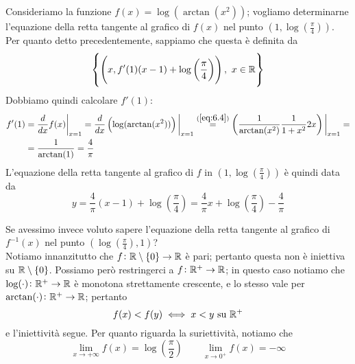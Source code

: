 \begin{example}
    Consideriamo la funzione $f(x) = \log(\arctan(x^2))$; vogliamo determinarne l'equazione della retta tangente al grafico di $f(x)$ nel punto $\left(1, \log\left(\frac{\pi}{4}\right)\right)$. Per quanto detto precedentemente, sappiamo che questa è definita da
    \[
    \left\{\left(x, f'(1)(x-1)+\log\left(\frac{\pi}{4}\right)\right), \ x\in\amsbb{R}\right\}
    \]
    Dobbiamo quindi calcolare $f'(1)$:
    \[
    \begin{split}
        f'(1) & = \frac{d}{dx}f(x)\bigg|_{x=1} = \frac{d}{dx}\left(\log(\arctan(x^2))\right)\bigg|_{x=1}\overset{(\ref{eq:6.4})}{=}\left(\frac{1}{\arctan(x^2)}\frac{1}{1+x^2}2x\right)\bigg|_{x=1} =\\
        & = \frac{1}{\arctan(1)} = \frac{4}{\pi}
    \end{split}
    \]
    L'equazione della retta tangente al grafico di $f$ in $\left(1, \log\left(\frac{\pi}{4}\right)\right)$ è quindi data da
    \[
    y = \frac{4}{\pi}(x-1)+\log\left(\frac{\pi}{4}\right) = \frac{4}{\pi}x+\log\left(\frac{\pi}{4}\right) - \frac{4}{\pi} 
    \]
    \begin{center}
    \end{center}
    Se avessimo invece voluto sapere l'equazione della retta tangente al grafico di $f^{-1}(x)$ nel punto $\left(\log\left(\frac{\pi}{4}\right), 1\right)$?\\
    Notiamo innanzitutto che $f\colon\amsbb{R}\setminus\{0\} \to \amsbb{R}$ è pari; pertanto questa non è iniettiva su $\amsbb{R}\setminus\{0\}$. Possiamo però restringerci a $f\colon \amsbb{R}^+\to \amsbb{R}$; in questo caso notiamo che $\log(\cdot)\colon \amsbb{R}^+\to \amsbb{R}$ è monotona strettamente crescente, e lo stesso vale per $\arctan(\cdot)\colon \amsbb{R}^+\to\amsbb{R}$; pertanto
    \[
    f(x)<f(y) \iff x<y \ \text{su} \ \amsbb{R}^+
    \]
    e l'iniettività segue. Per quanto riguarda la suriettività, notiamo che
    \[
    \lim_{x\to +\infty} f(x) = \log\left(\frac{\pi}{2}\right) \qquad \lim_{x\to 0^+} f(x) = -\infty
\]
\end{example}
